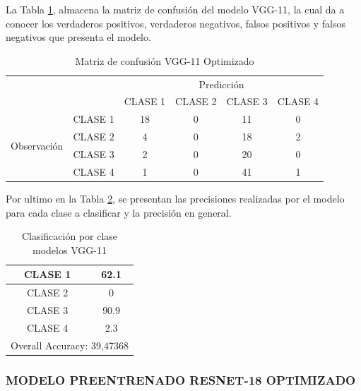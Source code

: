 	\newpage
	La Tabla \ref{tab:MC_VGG11_OPT}, almacena la matriz de confusión del modelo VGG-11, la cual da a conocer los verdaderos positivos, verdaderos negativos, falsos positivos y falsos negativos que presenta el modelo.
		\begin{table}[htbp]
			\centering
			\begin{tabular}{|c|l|c|c|c|c|}
				\hline
				\multicolumn{2}{|c|}{\multirow{2}[4]{*}{}} & \multicolumn{4}{c|}{Predicción} \bigstrut\\
				\cline{3-6}    \multicolumn{2}{|c|}{} & CLASE 1 & CLASE 2 & CLASE 3 & CLASE 4 \bigstrut\\
				\hline
				\multirow{4}[8]{*}{\begin{sideways}Observación\end{sideways}} & CLASE 1 & 18     & 0     & 11    & 0 \bigstrut\\
				\cline{2-6}          & CLASE 2 & 4     & 0     & 18    & 2 \bigstrut\\
				\cline{2-6}          & CLASE 3 & 2     & 0     & 20    & 0 \bigstrut\\
				\cline{2-6}          & CLASE 4 & 1     & 0     & 41    & 1 \bigstrut\\
				\hline
			\end{tabular}%
			\caption{Matriz de confusión VGG-11 Optimizado }
			\label{tab:MC_VGG11_OPT}%
		\end{table}%
	
	Por ultimo en la Tabla \ref{tab:VGG11optclases}, se presentan las precisiones realizadas por el modelo para cada clase a clasificar y la precisión en general.
	
		\begin{table}[htbp]
			\centering
			\begin{tabular}{|c|c|}
				\hline
				CLASE 1 & 62.1 \bigstrut\\
				\hline
				CLASE 2 & 0 \bigstrut\\
				\hline
				CLASE 3 & 90.9 \bigstrut\\
				\hline
				CLASE 4 & 2.3 \bigstrut\\
				\hline
				\multicolumn{2}{|c|}{Overall Accuracy: 39,47368} \bigstrut\\
				\hline
			\end{tabular}%
			\caption{Clasificación por clase modelos VGG-11}
			\label{tab:VGG11optclases}%
		\end{table}%

	\newpage	
	\subsubsection{\MakeUppercase{Modelo Preentrenado ResNet-18 Optimizado}}
	
